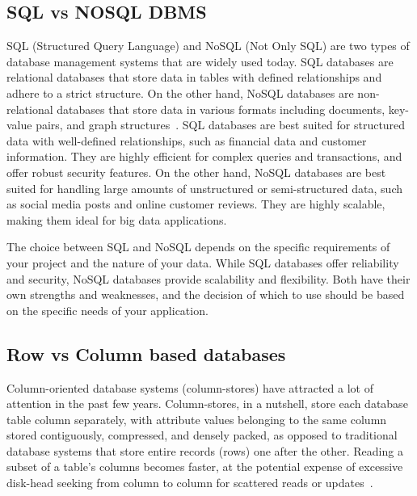 \subsection{SQL vs NOSQL DBMS}
SQL (Structured Query Language) and NoSQL (Not Only SQL) are two types of database management systems that are widely used today. 
SQL databases are relational databases that store data in tables with defined relationships and adhere to a strict structure. 
On the other hand, NoSQL databases are non-relational databases that store data in various formats including documents, 
key-value pairs, and graph structures~\cite{M0M14}.
SQL databases are best suited for structured data with well-defined relationships, such as financial data and customer information. 
They are highly efficient for complex queries and transactions, and offer robust security features. 
On the other hand, NoSQL databases are best suited for handling large amounts of unstructured or semi-structured data, 
such as social media posts and online customer reviews. 
They are highly scalable, making them ideal for big data applications.

The choice between SQL and NoSQL depends on the specific requirements of your project and the nature of your data.
 While SQL databases offer reliability and security, NoSQL databases provide scalability and flexibility. 
 Both have their own strengths and weaknesses, and the decision of which to use should be based on the specific needs of your application.

\subsection{Row vs Column based databases}
Column-oriented database systems (column-stores) have attracted
a lot of attention in the past few years. Column-stores, in a
nutshell, store each database table column separately, with
attribute values belonging to the same column stored
contiguously, compressed, and densely packed, as opposed to
traditional database systems that store entire records (rows) one
after the other. Reading a subset of a table's columns becomes
faster, at the potential expense of excessive disk-head seeking
from column to column for scattered reads or updates~\cite{ABH09}.

